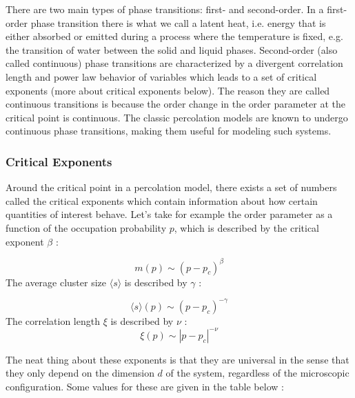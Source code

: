 There are two main types of phase transitions: first- and second-order.
In a first-order phase transition there is what we call a latent heat, i.e. energy that is either absorbed or emitted during a process where the temperature is fixed, e.g. the transition of water between the solid and liquid phases.
Second-order (also called continuous) phase transitions are characterized by a divergent correlation length and power law behavior of variables which leads to a set of critical exponents (more about critical exponents below).
The reason they are called continuous transitions is because the order change in the order parameter at the critical point is continuous.
The classic percolation models are known to undergo continuous phase transitions, making them useful for modeling such systems.



\subsubsection{Critical Exponents}
Around the critical point in a percolation model, there exists a set of numbers called the critical exponents which contain information about how certain quantities of interest behave.
Let's take for example the order parameter as a function of the occupation probability $p$, which is described by the critical exponent $\beta$ \cite{intro_to_percolation_theory}:

\begin{equation}
	\label{eqn:crit_exp_P}
	m(p) \sim (p - p_c)^\beta
\end{equation}
The average cluster size $\langle s \rangle$ is described by $\gamma$ \cite{intro_to_percolation_theory}:

\begin{equation}
	\label{eqn:crit_exp_s}
	\langle s \rangle (p) \sim (p - p_c)^{-\gamma}
\end{equation}
The correlation length $\xi$ is described by $\nu$ \cite{intro_to_percolation_theory}:
\begin{equation}
	\label{eqn:crit_exp_xi}
	\xi (p) \sim |p - p_c|^{-\nu}
\end{equation}

The neat thing about these exponents is that they are universal in the sense that they only depend on the dimension $d$ of the system, regardless of the microscopic configuration.
Some values for these are given in the table below \cite{intro_to_percolation_theory}:

